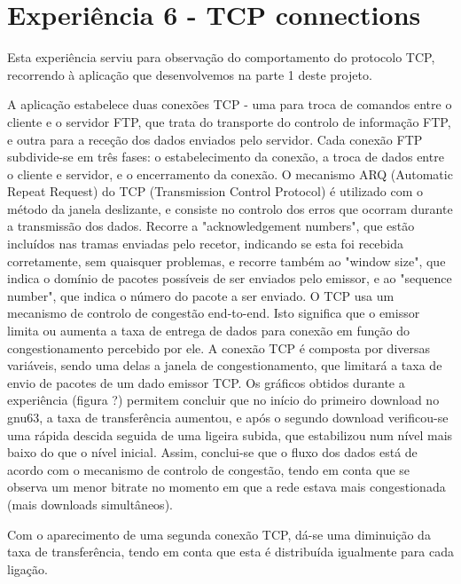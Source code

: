 \documentclass[article, a4paper, 11pt, oneside]{memoir}
\begin{document}
\section{Experiência 6 - TCP connections}

Esta experiência serviu para observação do comportamento do protocolo TCP, 
recorrendo à aplicação que desenvolvemos na parte 1 deste projeto. 

A aplicação estabelece duas conexões TCP - uma para troca de comandos entre o cliente e o servidor FTP, que trata do transporte do controlo de informação FTP, e outra para a receção dos dados enviados pelo servidor.
Cada conexão FTP subdivide-se em três fases: o estabelecimento da conexão, a troca de dados entre o cliente e servidor, e o encerramento da conexão.
O mecanismo ARQ (Automatic Repeat Request) do TCP (Transmission Control Protocol) é utilizado com o método da janela deslizante, e consiste no controlo dos erros que ocorram durante a transmissão dos dados.
Recorre a "acknowledgement numbers", que estão incluídos nas tramas enviadas pelo recetor, indicando se esta foi recebida corretamente, sem quaisquer problemas, e recorre também ao "window size", que indica o domínio de pacotes possíveis de ser enviados pelo emissor, e ao "sequence number", que indica o número do pacote a ser enviado.
O TCP usa um mecanismo de controlo de congestão end-to-end. Isto significa que o emissor limita ou aumenta a taxa de entrega de dados para conexão em função do congestionamento percebido por ele.
A conexão TCP é composta por diversas variáveis, sendo uma delas a janela de congestionamento, que limitará a taxa de envio de pacotes de um dado emissor TCP.
Os gráficos obtidos durante a experiência (figura ?) permitem concluir que no início do primeiro download no gnu63, a taxa de transferência aumentou, e após o segundo download verificou-se uma rápida descida seguida de uma ligeira subida, que estabilizou num nível mais baixo do que o nível inicial.
Assim, conclui-se que o fluxo dos dados está de acordo com o mecanismo de controlo de congestão, tendo em conta que se observa um menor bitrate no momento em que a rede estava mais congestionada (mais downloads simultâneos).

Com o aparecimento de uma segunda conexão TCP, dá-se uma diminuição da taxa de transferência, tendo em conta que esta é distribuída igualmente para cada ligação.

\end{document}
